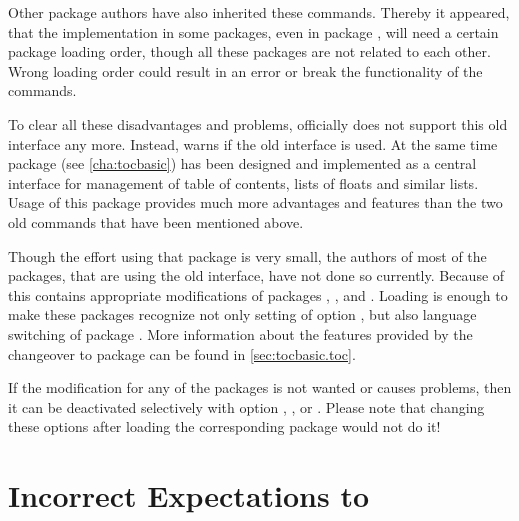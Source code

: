 Other package authors have also inherited these commands. Thereby it appeared,
that the implementation in some packages, even in package ,
will need a certain package loading order, though all these packages are not
related to each other. Wrong loading order could result in an error or break the
functionality of the commands.

To clear all these disadvantages and problems, \KOMAScript{} officially does not
support this old interface any more. Instead, \KOMAScript{} warns if the old
interface is used. At the same time package
 (see
\autoref{cha:tocbasic}) has been designed and implemented as a central
interface for management of table of contents, lists of floats and similar
lists. Usage of this package provides much more advantages and features than
the two old commands that have been mentioned above.

Though the effort using that package is very small, the authors of most of the
packages, that are using the old interface, have not done so currently. Because
of this  contains appropriate modifications of packages
,
, and
. Loading  is enough
to make these packages recognize not only setting of \KOMAScript{} option
, but also language
switching of package . More information
about the features provided by the changeover to package 
can be found in \autoref{sec:tocbasic.toc}.

If the modification for any of the packages is not wanted or causes problems,
then it can be deactivated selectively with option
,
,
or
.
Please note that changing these options after loading the
corresponding package would not do it!


\section{Incorrect Expectations to }


